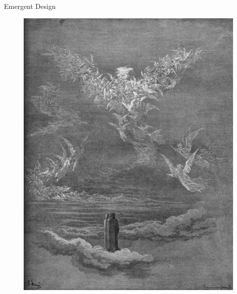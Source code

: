 \documentclass[12pt,xcolor=x11names]{beamer}
\begin{document}
\begin{frame}{Emergent Design}
    \begin{figure}
        \centering \includegraphics[height=0.75\textheight]{images/emergentdesign.jpg}
    \end{figure}
\end{frame}
\end{document}
